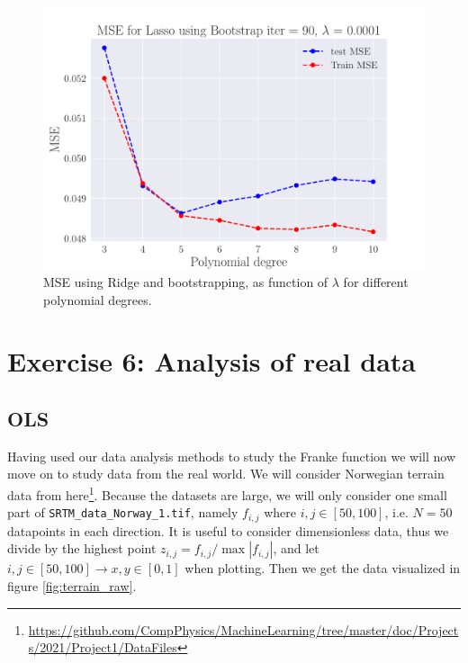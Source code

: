 \documentclass[reprint,english,notitlepage,aps,nobalancelastpage,nofootinbib]{revtex4-1}  %
\begin{document}
\begin{figure}[H]
	\includegraphics[width=\linewidth]{MSE_Lasso_n30_eps02_pol10_Bootstrap_re90_lam_0_0001.pdf}
	\caption{MSE using Ridge and bootstrapping, as function of $\lambda$ for different polynomial degrees.}
	\label{fig:Ridge_boot_BVT}
\end{figure}



\section*{Exercise 6: Analysis of real data}
\subsection*{OLS}
Having used our data analysis methods to study the Franke function we will now move on to study data from the real world. We will consider Norwegian terrain data from here\footnote{\href{https://github.com/CompPhysics/MachineLearning/tree/master/doc/Projects/2021/Project1/DataFiles}{https://github.com/CompPhysics/MachineLearning/tree/master/doc/Projects/2021/Project1/DataFiles}}. Because the datasets are large, we will only consider one small part of \texttt{SRTM\_data\_Norway\_1.tif}, namely $f_{i,j}$ where $i,j\in[50,100]$, i.e. $N=50$ datapoints in each direction. It is useful to consider dimensionless data, thus we divide by the highest point $z_{i,j} = f_{i,j}/\max{|f_{i,j}|}$, and let $i,j\in[50,100] \rightarrow x,y\in[0,1]$ when plotting. Then we get the data visualized in figure \ref{fig:terrain_raw}.
\end{document}
